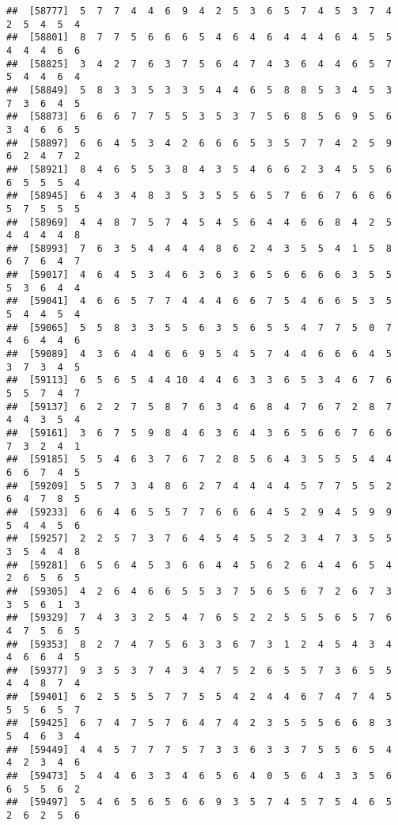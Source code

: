 \documentclass[
]{book}
\begin{document}
\begin{verbatim}
##  [58777]  5  7  7  4  4  6  9  4  2  5  3  6  5  7  4  5  3  7  4  2  5  4  5  4
##  [58801]  8  7  7  5  6  6  6  5  4  6  4  6  4  4  4  6  4  5  5  4  4  4  6  6
##  [58825]  3  4  2  7  6  3  7  5  6  4  7  4  3  6  4  4  6  5  7  5  4  4  6  4
##  [58849]  5  8  3  3  5  3  3  5  4  4  6  5  8  8  5  3  4  5  3  7  3  6  4  5
##  [58873]  6  6  6  7  7  5  5  3  5  3  7  5  6  8  5  6  9  5  6  3  4  6  6  5
##  [58897]  6  6  4  5  3  4  2  6  6  6  5  3  5  7  7  4  2  5  9  6  2  4  7  2
##  [58921]  8  4  6  5  5  3  8  4  3  5  4  6  6  2  3  4  5  5  6  6  5  5  5  4
##  [58945]  6  4  3  4  8  3  5  3  5  5  6  5  7  6  6  7  6  6  6  5  7  5  5  5
##  [58969]  4  4  8  7  5  7  4  5  4  5  6  4  4  6  6  8  4  2  5  4  4  4  4  8
##  [58993]  7  6  3  5  4  4  4  4  8  6  2  4  3  5  5  4  1  5  8  6  7  6  4  7
##  [59017]  4  6  4  5  3  4  6  3  6  3  6  5  6  6  6  6  3  5  5  5  3  6  4  4
##  [59041]  4  6  6  5  7  7  4  4  4  6  6  7  5  4  6  6  5  3  5  5  4  4  5  4
##  [59065]  5  5  8  3  3  5  5  6  3  5  6  5  5  4  7  7  5  0  7  4  6  4  4  6
##  [59089]  4  3  6  4  4  6  6  9  5  4  5  7  4  4  6  6  6  4  5  3  7  3  4  5
##  [59113]  6  5  6  5  4  4 10  4  4  6  3  3  6  5  3  4  6  7  6  5  5  7  4  7
##  [59137]  6  2  2  7  5  8  7  6  3  4  6  8  4  7  6  7  2  8  7  4  4  3  5  4
##  [59161]  3  6  7  5  9  8  4  6  3  6  4  3  6  5  6  6  7  6  6  7  3  2  4  1
##  [59185]  5  5  4  6  3  7  6  7  2  8  5  6  4  3  5  5  5  4  4  6  6  7  4  5
##  [59209]  5  5  7  3  4  8  6  2  7  4  4  4  4  5  7  7  5  5  2  6  4  7  8  5
##  [59233]  6  6  4  6  5  5  7  7  6  6  6  4  5  2  9  4  5  9  9  5  4  4  5  6
##  [59257]  2  2  5  7  3  7  6  4  5  4  5  5  2  3  4  7  3  5  5  3  5  4  4  8
##  [59281]  6  5  6  4  5  3  6  6  4  4  5  6  2  6  4  4  6  5  4  2  6  5  6  5
##  [59305]  4  2  6  4  6  6  5  5  3  7  5  6  5  6  7  2  6  7  3  3  5  6  1  3
##  [59329]  7  4  3  3  2  5  4  7  6  5  2  2  5  5  5  6  5  7  6  4  7  5  6  5
##  [59353]  8  2  7  4  7  5  6  3  3  6  7  3  1  2  4  5  4  3  4  4  6  6  4  5
##  [59377]  9  3  5  3  7  4  3  4  7  5  2  6  5  5  7  3  6  5  5  4  4  8  7  4
##  [59401]  6  2  5  5  5  7  7  5  5  4  2  4  4  6  7  4  7  4  5  5  5  6  5  7
##  [59425]  6  7  4  7  5  7  6  4  7  4  2  3  5  5  5  6  6  8  3  5  4  6  3  4
##  [59449]  4  4  5  7  7  7  5  7  3  3  6  3  3  7  5  5  6  5  4  4  2  3  4  6
##  [59473]  5  4  4  6  3  3  4  6  5  6  4  0  5  6  4  3  3  5  6  6  5  5  6  2
##  [59497]  5  4  6  5  6  5  6  6  9  3  5  7  4  5  7  5  4  6  5  2  6  2  5  6

\end{verbatim}
\end{document}
